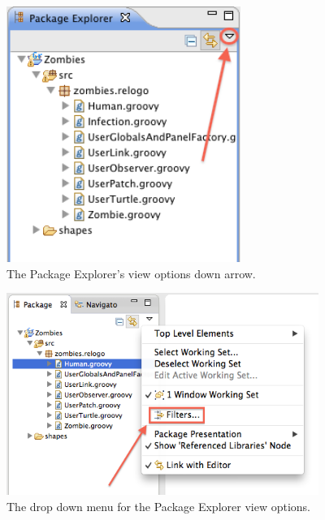 \documentclass[11pt]{amsart}
\begin{document}
\begin{figure}
\begin{center}
\vspace{.2in}
\centerline {
\includegraphics[width=3in]{GettingStartedImages/PackageExplorerArrow.png}
}
\caption{The Package Explorer's view options down arrow.}
\label{fig:downarrow}
\end{center}
\end{figure}

\begin{figure}
\begin{center}
\vspace{.2in}
\centerline {
\includegraphics[width=4in]{GettingStartedImages/PackageExplorerFIlter2.png}
}
\caption{The drop down menu for the Package Explorer view options.}
\label{fig:resourcefilter2}
\end{center}
\end{figure}
\end{document}
